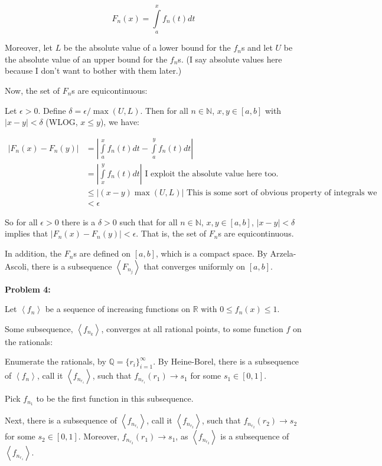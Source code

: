\documentclass[a4paper,12pt]{article}
\newcommand{\tab}{\hspace{4mm}} %
\newcommand{\shunt}{\vspace{20mm}}
\newcommand{\absval}[1]{\left\lvert #1 \right\rvert}
\newcommand{\anbrack}[1]{\left\langle #1 \right\rangle}
\newcommand{\de}{\delta}
\newcommand{\ep}{\epsilon}
\newcommand{\N}{\mathbb{N}}
\newcommand{\Q}{\mathbb{Q}}
\newcommand{\R}{\mathbb{R}}
\begin{document}
\begin{displaymath}
F_n(x) = \int\limits_a^x f_n(t)dt
\end{displaymath}

Moreover, let $L$ be the absolute value of a lower bound for the $f_n$s and let $U$ be the absolute value of an upper bound for the $f_n$s. (I say absolute values here because I don't want to bother with them later.)

Now, the set of $F_n$s are equicontinuous:

\tab Let $\ep >0$. Define $\de = \ep /\max(U,L)$. Then for all $n \in \N$, $x, y \in [a,b]$ with $\absval{x-y} < \de$ (WLOG, $x \leq y$), we have:

\begin{align*}
\absval{F_n(x)-F_n(y)} &= \absval{\int\limits_a^x f_n(t)dt - \int\limits_a^y f_n(t)dt} \\
&= \absval{\int\limits_x^y f_n(t)dt} \text{ I exploit the absolute value here too.} \\
&\leq \absval{(x-y)\max(U,L)} \text{ This is some sort of obvious property of integrals we should know} \\
&< \ep
\end{align*}

\tab So for all $\ep>0$ there is a $\de >0$ such that for all $n \in \N$, $x,y \in [a,b]$, $\absval{x-y} < \de$ implies that $\absval{F_n(x)-F_n(y)} < \ep$. That is, the set of $F_n$s are equicontinuous.

In addition, the $F_n$s are defined on $[a,b]$, which is a compact space. By Arzela-Ascoli, there is a subsequence $\anbrack{F_{n_j}}$ that converges uniformly on $[a,b]$.

\shunt

{\bf Problem 4:}

Let $\anbrack{f_n}$ be a sequence of increasing functions on $\R$ with $0 \leq f_n(x) \leq 1$. 

Some subsequence, $\anbrack{f_{n_k}}$, converges at all rational points, to some function $f$ on the rationals:

\tab Enumerate the rationals, by $\Q = \{r_i\}_{i=1}^\infty$. By Heine-Borel, there is a subsequence of $\anbrack{f_n}$, call it $\anbrack{f_{n_{r_1}}}$, such that $f_{n_{r_1}}(r_1) \to s_1$ for some $s_1 \in [0,1]$.

\tab Pick $f_{n_1}$ to be the first function in this subsequence.

\tab Next, there is a subsequence of $\anbrack{f_{n_{r_1}}}$, call it $\anbrack{f_{n_{r_2}}}$, such that $f_{n_{r_2}}(r_2) \to s_2$ for some $s_2 \in [0,1]$. Moreover, $f_{n_{r_2}}(r_1) \to s_1$, as $\anbrack{f_{n_{r_2}}}$ is a subsequence of $\anbrack{f_{n_{r_1}}}$.
\end{document}
